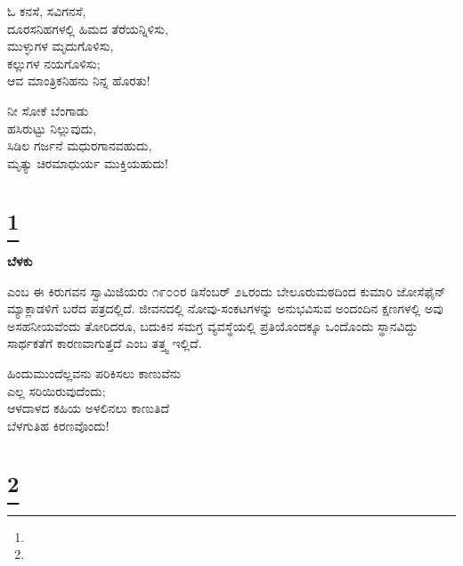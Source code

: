 \begin{myquote}
ಓ ಕನಸೆ, ಸವಿಗನಸೆ,\\ದೂರಸನಿಹಗಳಲ್ಲಿ ಹಿಮದ ತೆರೆಯನ್ನಿಳಿಸು,\\ಮುಳ್ಳುಗಳ ಮೃದುಗೊಳಿಸು,\\ಕಲ್ಲುಗಳ ನಯಗೊಳಿಸು;\\ಆವ ಮಾಂತ್ರಿಕನಿಹನು ನಿನ್ನ ಹೊರತು!
\end{myquote}

\begin{myquote}
ನೀ ಸೋಕೆ ಬೆಂಗಾಡು\\ಹಸಿರುಟ್ಟು ನಿಲ್ಲುವುದು,\\ಸಿಡಿಲ ಗರ್ಜನೆ ಮಧುರಗಾನವಹುದು,\\ಮೃತ್ಯು ಚಿರಮಾಧುರ್ಯ ಮುಕ್ತಿಯಹುದು!
\end{myquote}

\selecteng

\chapter[LIGHT]{\protect\footnote{}}

\begin{myquote}
\end{myquote}

\selectkan

\begin{center}
\textbf{ಬೆಳಕು}
\end{center}

 ಎಂಬ ಈ ಕಿರುಗವನ ಸ್ವಾಮಿಜಿಯರು ೧೯೦೦ರ ಡಿಸೆಂಬರ್ ೨೬ರಂದು ಬೇಲೂರುಮಠದಿಂದ ಕುಮಾರಿ ಜೋಸೆಫೈನ್ ಮ್ಯಾಕ್ಲಾಡಳಿಗೆ ಬರೆದ ಪತ್ರದಲ್ಲಿದೆ. ಜೀವನದಲ್ಲಿ ನೋವು-ಸಂಕಟಗಳನ್ನು ಅನುಭವಿಸುವ ಅಂದಂದಿನ ಕ್ಷಣಗಳಲ್ಲಿ ಅವು ಅಸಹನೀಯವೆಂದು ತೋರಿದರೂ, ಬದುಕಿನ ಸಮಗ್ರ ವ್ಯವಸ್ಥೆಯಲ್ಲಿ ಪ್ರತಿಯೊಂದಕ್ಕೂ ಒಂದೊಂದು ಸ್ಥಾನವಿದ್ದು ಸಾರ್ಥಕತೆಗೆ ಕಾರಣವಾಗುತ್ತದೆ ಎಂಬ ತತ್ತ್ವ ಇಲ್ಲಿದೆ.

\begin{myquote}
ಹಿಂದುಮುಂದೆಲ್ಲವನು ಪರಿಕಿಸಲು ಕಾಣುವೆನು\\ಎಲ್ಲ ಸರಿಯಿರುವುದೆಂದು;\\ಆಳದಾಳದ ಕಹಿಯ ಅಳಲಿನಲು ಕಾಣುತಿದೆ\\ಬೆಳಗುತಿಹ ಕಿರಣವೊಂದು!
\end{myquote}

\selecteng

\chapter[THE LIVING GOD]{\protect\footnote{}}

